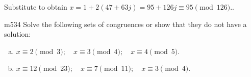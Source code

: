 Substitute to obtain $x = 1 + 2(47+ 63j) = 95 + 126j \equiv 95 \pmod{126}.$.  


\begin{exercise}{m534}
Solve the following sets of congruences or show that they do not have a solution:
\begin{enumerate}[(a)]
\item
$x \equiv 2 \pmod{3}; \quad x \equiv 3 \pmod{4}; \quad x \equiv 4 \pmod{5}.$
\item
$x \equiv 12 \pmod{23}; \quad x \equiv 7 \pmod{11}; \quad x \equiv 3 \pmod{4}.$
\end {enumerate}
\end {exercise}
